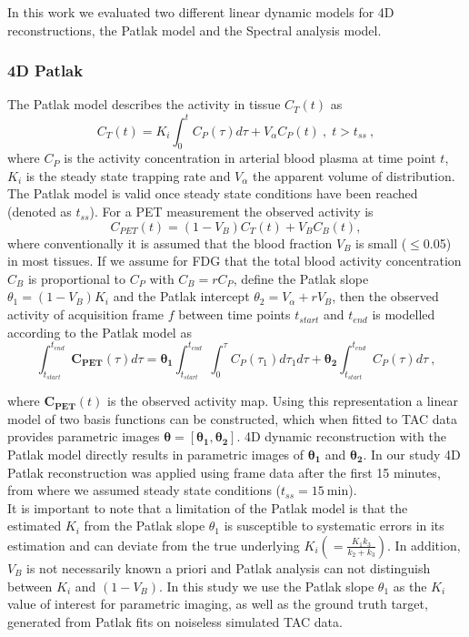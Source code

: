 In this work we evaluated two different linear dynamic models for 4D reconstructions, the Patlak model and the Spectral analysis model.

\subsubsection{4D Patlak} 
The Patlak model describes the activity in tissue ${C_{T}}(t)$ as
\begin{equation} \label{Patlak}
{C_{T}}(t) = {K_i} \int_{0}^{t} C_{P}(\tau) d\tau +  {V_{\alpha}} C_{P}(t) \ , \;  t>t_{ss} \ ,
\end{equation}
where $C_{P}$ is the activity concentration in arterial blood plasma at time point $t$, $K_i$ is the steady state trapping rate and $V_{\alpha}$ the apparent volume of distribution. The Patlak model is valid once steady state conditions have been reached (denoted as $t_{ss}$). 
For a PET measurement the observed activity is
\begin{equation} \label{C_PET}
{C_{PET}}(t)  = (1-V_{B}){C_{T}}(t) + V_{B}C_{B}(t),
\end{equation}
where conventionally it is assumed that the blood fraction $V_B$ is small ($	\leq$0.05) in most tissues. If we assume for FDG that the total blood activity concentration $C_{B}$ is proportional to $C_{P}$ with $C_{B} = r C_{P}$, define the Patlak slope $\theta_1 = (1-V_{B})K_i$ and the Patlak intercept $\theta_2 = V_{\alpha}+r V_{B}$, then the observed activity of acquisition frame $f$ between time points $t_{start}$ and $t_{end}$ is modelled according to the Patlak model as
\begin{equation} \label{PatlakEq}
\int_{t_{start}}^{t_{end}} \boldsymbol{C_{PET}}(\tau) d\tau = \boldsymbol{\theta_1} \int_{t_{start}}^{t_{end}}\int_{0}^{\tau} C_{P}(\tau_1) d\tau_1 d\tau + \boldsymbol{\theta_2} \int_{t_{start}}^{t_{end}} C_{P}(\tau) d\tau  \ ,
\end{equation}

where $\boldsymbol{C_{PET}}(t)$ is the observed activity map.
Using this representation a linear model of two basis functions can be constructed, which when fitted to TAC data provides parametric images $\boldsymbol\theta=[\boldsymbol{\theta_1},\boldsymbol{\theta_2}]$.
4D dynamic reconstruction with the Patlak model directly results in parametric images of $\boldsymbol{\theta_1}$ and $\boldsymbol{\theta_2}$. In our study 4D Patlak reconstruction was applied using frame data after the first 15 minutes, from where we assumed steady state conditions ($t_{ss} = 15~\mathrm{min}$). \\
It is important to note that a limitation of the Patlak model is that the estimated $K_i$ from the Patlak slope $\theta_1$ is susceptible to systematic errors in its estimation and can deviate from the true underlying $K_i (= \frac{K_1 k_3}{k_2+k_3})$.
In addition, $V_B$ is not necessarily known a priori and Patlak analysis can not distinguish between $K_i$ and $(1-V_B)$.
In this study we use the Patlak slope $\theta_1$ as the $K_i$ value of interest for parametric imaging, as well as the ground truth target, generated from Patlak fits on noiseless simulated TAC data.

